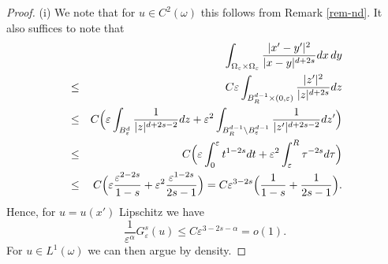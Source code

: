 \documentclass{article}
\newcommand{\e}{\varepsilon}
\begin{document}
\begin{proof} (i) We note that for $u\in C^2(\omega)$ this follows from Remark \ref{rem-nd}.
It also suffices to note that 
\begin{eqnarray*}
&&\hskip-1cm\int_{\Omega_\e\times\Omega_\e} \frac{|x'-y'|^2}{|x-y|^{d+2s}} dx\,dy\\
&\le& C\e \int_{B^{d-1}_R\times (0,\e)}\frac{|z'|^2}{|z|^{d+2s}} dz\\
&\le& C\Big(\e \int_{B^{d}_\e}\frac{1}{|z|^{d+2s-2}} dz +\e^2 \int_{B^{d-1}_R\setminus B^{d-1}_\e}
\frac{1}{|z'|^{d+2s-2}} dz'\Big) \\
&\le& C\Big(\e \int_{0}^\e t^{1-2s} dt +\e^2 \int_\e^R\tau^{-2s} d\tau\Big) \\
&\le& C\Big(\e\frac{\e^{2-2s}}{1-s}+\e^2\frac{\e^{1-2s}}{2s-1}\Big)= C\e^{3-2s}\Big(\frac{1}{1-s}+\frac{1}{2s-1}\Big).
\end{eqnarray*}
Hence, for $u=u(x')$ Lipschitz we have
$$
\frac1{\e^\alpha}G^s_\e(u)\le C\e^{3-2s-\alpha}=o(1).
$$
For $u\in L^1(\omega)$ we can then argue by density. 


\end{proof}
\end{document}
